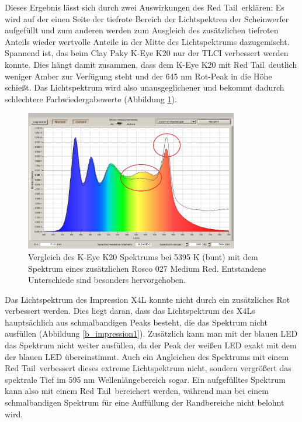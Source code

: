 \noindent Dieses Ergebnis lässt sich durch zwei Auswirkungen des \glqq Red Tail\grqq\ erklären: Es wird auf der einen Seite der tiefrote Bereich der Lichtspektren der Scheinwerfer aufgefüllt und zum anderen werden zum Ausgleich des zusätzlichen tiefroten Anteils wieder wertvolle Anteile in der Mitte des Lichtspektrums dazugemischt.\\
Spannend ist, das beim Clay Paky K-Eye K20 nur der TLCI verbessert werden konnte. Dies hängt damit zusammen, dass dem K-Eye K20 mit \glqq Red Tail\grqq\ deutlich weniger Amber zur Verfügung steht und der 645 nm Rot-Peak in die Höhe schießt. Das Lichtspektrum wird also unausgeglichener und bekommt dadurch schlechtere Farbwiedergabewerte (Abbildung \ref{b_keye1}).
\begin{figure}[H]     %
\centering
\includegraphics[width=0.83\textwidth]{bilder/keye1} 
\caption {Vergleich des K-Eye K20 Spektrums bei 5395 K (bunt) mit dem Spektrum eines zusätzlichen Rosco 027 \glqq Medium Red\grqq . Entstandene Unterschiede sind besonders hervorgehoben.}\label{b_keye1}
\end{figure}

\noindent Das Lichtspektrum des Impression X4L konnte nicht durch ein zusätzliches Rot verbessert werden. Dies liegt daran, dass das Lichtspektrum des X4Ls hauptsächlich aus schmalbandigen Peaks besteht, die das Spektrum nicht ausfüllen (Abbildung \ref{b_impression1}). Zusätzlich kann man mit der blauen LED das Spektrum nicht weiter ausfüllen, da der Peak der weißen LED exakt mit dem der blauen LED übereinstimmt. Auch ein Angleichen des Spektrums mit einem \glqq Red Tail\grqq\ verbessert dieses extreme Lichtspektrum nicht, sondern vergrößert das spektrale Tief im 595 nm Wellenlängebereich sogar. Ein aufgefülltes Spektrum kann also mit einem \glqq Red Tail\grqq\ bereichert werden, während man bei einem schmalbandigen Spektrum für eine Auffüllung der Randbereiche nicht belohnt wird.\\

